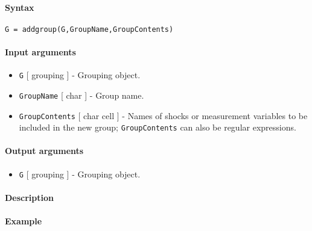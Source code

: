 


	\paragraph{Syntax}

\begin{verbatim}
G = addgroup(G,GroupName,GroupContents)
\end{verbatim}

\paragraph{Input arguments}

\begin{itemize}
\item
  \texttt{G} {[} grouping {]} - Grouping object.
\item
  \texttt{GroupName} {[} char {]} - Group name.
\item
  \texttt{GroupContents} {[} char \textbar{} cell {]} - Names of shocks
  or measurement variables to be included in the new group;
  \texttt{GroupContents} can also be regular expressions.
\end{itemize}

\paragraph{Output arguments}

\begin{itemize}
\itemsep1pt\parskip0pt
\item
  \texttt{G} {[} grouping {]} - Grouping object.
\end{itemize}

\paragraph{Description}

\paragraph{Example}


